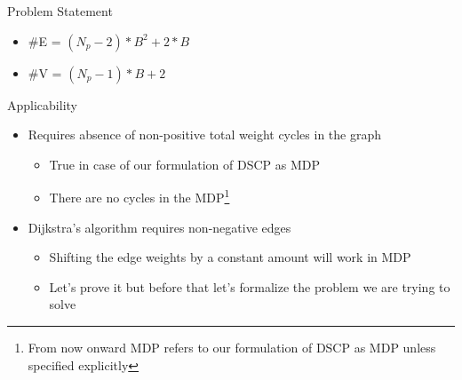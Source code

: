 \documentclass{beamer}
\begin{document}
\begin{frame}{Problem Statement}
\begin{itemize}
\begin{center}
\begin{figure}[h]
\end{figure}
\end{center}
\item \#E = $(N_p-2)*B^2 + 2*B$
\item \#V = $(N_p-1)*B + 2$
\end{itemize}
\end{frame}

\begin{frame}{Applicability}
\begin{itemize}
\item Requires absence of non-positive total weight cycles in the graph
\begin{itemize}
\item True in case of our formulation of DSCP as MDP
\item There are no cycles in the MDP\footnote{From now onward MDP refers to our formulation of DSCP as MDP unless specified explicitly}
\end{itemize}
\item Dijkstra's algorithm requires non-negative edges
\begin{itemize}
\item Shifting the edge weights by a constant amount will work in MDP
\item Let's prove it but before that let's formalize the problem we are trying to solve
\end{itemize}
\end{itemize}
\end{frame}
\end{document}
